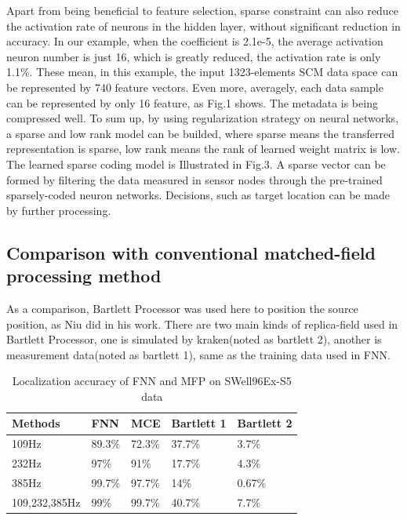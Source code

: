 Apart from being beneficial to feature selection, sparse constraint can also reduce the activation rate of neurons in the hidden layer, without significant reduction in accuracy. In our example, when the coefficient is 2.1e-5, the average activation neuron number is just 16, which is greatly reduced, the activation rate is only 1.1{\%}.
These mean, in this example, the input 1323-elements SCM  data space can be represented by 740 feature vectors. Even more, averagely, each data sample can be represented by only 16 feature, as Fig.1 shows. The metadata is being compressed well. To sum up, by using regularization strategy on neural networks, a sparse and low rank model can be builded, where sparse means the transferred representation is sparse, low rank means the rank of learned weight matrix is low. The learned sparse coding model is Illustrated in Fig.3.
A sparse vector can be formed by filtering the data measured in sensor nodes through the pre-trained sparsely-coded neuron networks. Decisions, such as target location can be made by further processing.

\subsection{Comparison with conventional matched-field processing method}
As a comparison, Bartlett Processor was used here to position the source position, as Niu did in his work. There are two main kinds of replica-field used in Bartlett Processor, one is simulated by kraken(noted as bartlett 2), another is measurement data(noted as bartlett 1), same as the training data used in FNN.
\begin{table}[]
\caption{Localization accuracy of FNN and MFP on SWell96Ex-S5 data}
\label{my-label}
\begin{tabular}{@{}lllll@{}}
\toprule
Methods       & FNN    & MCE    & Bartlett 1 & Bartlett 2 \\ \midrule
109Hz         & 89.3\% & 72.3\% & 37.7\%     & 3.7\%      \\
232Hz         & 97\%   & 91\%   & 17.7\%     & 4.3\%      \\
385Hz         & 99.7\% & 97.7\% & 14\%       & 0.67\%     \\
109,232,385Hz & 99\%   & 99.7\% & 40.7\%     & 7.7\%      \\ \bottomrule
\end{tabular}
\end{table}

